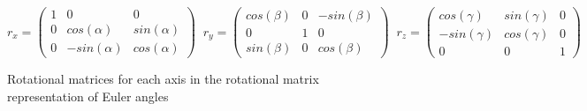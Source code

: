 \documentclass[12pt, a4paper]{report}
\theoremstyle{definition}
\begin{document}
\begin{figure}[H]
    \centering
    \begin{equation*}
        r_x = \begin{pmatrix}1&0&0 \\ 0&cos(\alpha)&sin(\alpha) \\ 0&-sin(\alpha)&cos(\alpha)\end{pmatrix}\;\;
        r_y = \begin{pmatrix}cos(\beta)&0&-sin(\beta) \\ 0&1&0 \\ sin(\beta)&0&cos(\beta)\end{pmatrix}\;\;
        r_z = \begin{pmatrix}cos(\gamma)&sin(\gamma)&0 \\ -sin(\gamma)&cos(\gamma)&0 \\ 0&0&1 \end{pmatrix}
    \end{equation*}
    \caption{Rotational matrices for each axis in the rotational matrix representation of Euler angles}
    \label{fig:rm_representation}
\end{figure}
\end{document}
